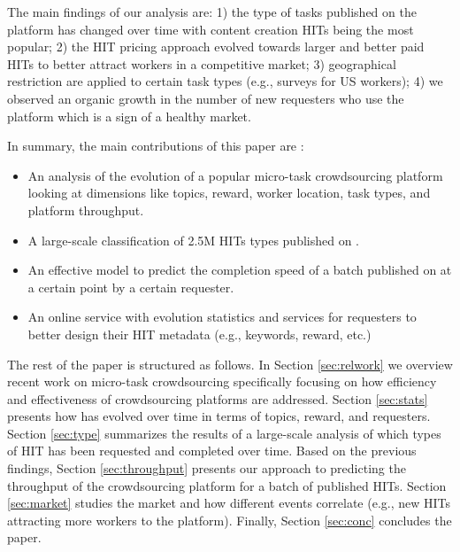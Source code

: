 The main findings of our analysis are: 1) the type of tasks published on the platform has changed over time with content creation HITs being the most popular; 2) the HIT pricing approach evolved towards larger and better paid HITs to better attract workers in a competitive market; 3) geographical restriction are applied to certain task types (e.g., surveys for US workers); 4) we observed an organic growth in the number of new requesters who use the platform which is a sign of a healthy market.


In summary, the main contributions of this paper are :
\begin{itemize}

	\item An analysis of the evolution of a popular micro-task crowdsourcing platform looking at dimensions like topics, reward, worker location, task types, and platform throughput.

	\item A large-scale classification of 2.5M HITs types published on \amt{}.

	\item An effective model to predict the completion speed of a batch published on \amt{} at a certain point by a certain requester.

	\item An online service with evolution statistics and services for requesters to better design their HIT metadata (e.g., keywords, reward, etc.)

\end{itemize}


The rest of the paper is structured as follows.
In Section \ref{sec:relwork} we overview recent work on micro-task crowdsourcing specifically focusing on how  efficiency and effectiveness  of crowdsourcing platforms are addressed.
Section \ref{sec:stats} presents how \amt{} has evolved over time in terms of topics, reward, and requesters.
Section \ref{sec:type} summarizes the results of a large-scale analysis of which types of HIT has been requested and completed over time.
Based on the previous findings, Section \ref{sec:throughput} presents our approach to predicting the throughput of the crowdsourcing platform for a batch of published HITs.
Section \ref{sec:market} studies the \amt{} market and how different events correlate (e.g., new HITs attracting more workers to the platform).
Finally, Section \ref{sec:conc} concludes the paper.

